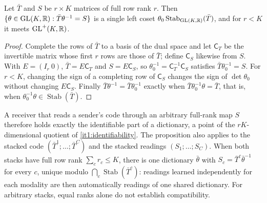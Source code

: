 Let $\bar T$ and $S$ be $r\times K$ matrices of full row rank $r$. Then $\{\theta\in\mathrm{GL}(K,\mathbb R):\bar T\theta^{-1}=S\}$ is a single left coset $\theta_0\operatorname{Stab}_{\mathrm{GL}(K,\mathbb R)}(\bar T)$, and for $r<K$ it meets $\mathrm{GL}^+(K,\mathbb R)$.
\begin{proof}
Complete the rows of $\bar T$ to a basis of the dual space and let $\mathsf C_T$ be the invertible matrix whose first $r$ rows are those of $\bar T$; define $\mathsf C_S$ likewise from $S$. With $E=(I_r\ 0)$, $\bar T=E\mathsf C_T$ and $S=E\mathsf C_S$, so $\theta_0^{-1}=\mathsf C_T^{-1}\mathsf C_S$ satisfies $\bar T\theta_0^{-1}=S$. For $r<K$, changing the sign of a completing row of $\mathsf C_S$ changes the sign of $\det\theta_0$ without changing $E\mathsf C_S$. Finally $\bar T\theta^{-1}=\bar T\theta_0^{-1}$ exactly when $\bar T\theta_0^{-1}\theta=\bar T$, that is, when $\theta_0^{-1}\theta\in\operatorname{Stab}(\bar T)$.
\end{proof}

A receiver that reads a sender's code through an arbitrary full-rank map $S$ therefore holds exactly the identifiable part of a dictionary, a point of the $rK$-dimensional quotient of \cref{it1:identifiability}. The proposition also applies to the stacked code $(\bar T^1;\ldots;\bar T^C)$ and the stacked readings $(S_1;\ldots;S_C)$. When both stacks have full row rank $\sum_cr_c\leq K$, there is one dictionary $\bar\theta$ with $S_c=\bar T^c\bar\theta^{-1}$ for every $c$, unique modulo $\bigcap_c\operatorname{Stab}(\bar T^c)$: readings learned independently for each modality are then automatically readings of one shared dictionary. For arbitrary stacks, equal ranks alone do not establish compatibility.

